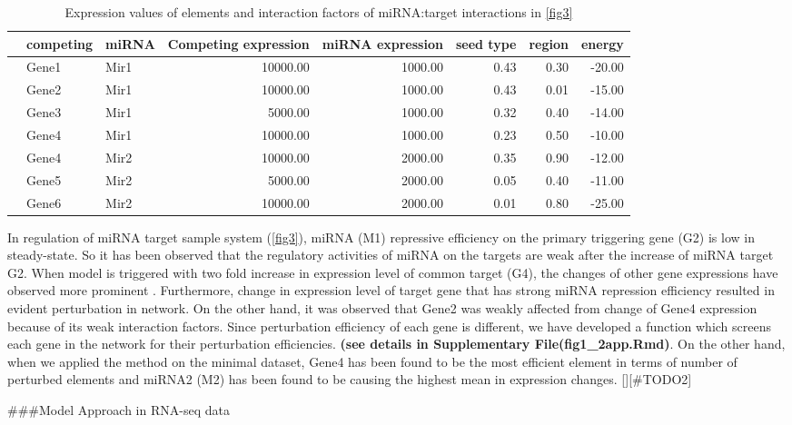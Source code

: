 \documentclass[]{article}
\begin{document}
\begin{table}[ht]
\centering
\caption{Expression values of elements and interaction factors of miRNA:target interactions in \autoref{fig3}} 
\begin{tabular}{rllrrrrr}
  \hline
 & competing & miRNA & Competing expression & miRNA expression & seed type & region & energy \\ 
  \hline
   & Gene1 & Mir1 & 10000.00 & 1000.00 & 0.43 & 0.30 & -20.00 \\ 
   & Gene2 & Mir1 & 10000.00 & 1000.00 & 0.43 & 0.01 & -15.00 \\ 
   & Gene3 & Mir1 & 5000.00 & 1000.00 & 0.32 & 0.40 & -14.00 \\ 
   & Gene4 & Mir1 & 10000.00 & 1000.00 & 0.23 & 0.50 & -10.00 \\ 
   & Gene4 & Mir2 & 10000.00 & 2000.00 & 0.35 & 0.90 & -12.00 \\ 
   & Gene5 & Mir2 & 5000.00 & 2000.00 & 0.05 & 0.40 & -11.00 \\ 
   & Gene6 & Mir2 & 10000.00 & 2000.00 & 0.01 & 0.80 & -25.00 \\ 
   \hline
\end{tabular}
\label{tab:one}
\end{table}

In regulation of miRNA target sample system (\autoref{fig3}), miRNA (M1)
repressive efficiency on the primary triggering gene (G2) is low in
steady-state. So it has been observed that the regulatory activities of
miRNA on the targets are weak after the increase of miRNA target G2.
When model is triggered with two fold increase in expression level of
common target (G4), the changes of other gene expressions have observed
more prominent \href{}{}. Furthermore, change in expression level of
target gene that has strong miRNA repression efficiency resulted in
evident perturbation in network. On the other hand, it was observed that
Gene2 was weakly affected from change of Gene4 expression because of its
weak interaction factors. Since perturbation efficiency of each gene is
different, we have developed a function which screens each gene in the
network for their perturbation efficiencies. \textbf{(see details in
Supplementary File(fig1\_2app.Rmd)}. On the other hand, when we applied
the method on the minimal dataset, Gene4 has been found to be the most
efficient element in terms of number of perturbed elements and miRNA2
(M2) has been found to be causing the highest mean in expression
changes. {[}{]}{[}\#TODO2{]}

\#\#\#Model Approach in RNA-seq data
\end{document}
